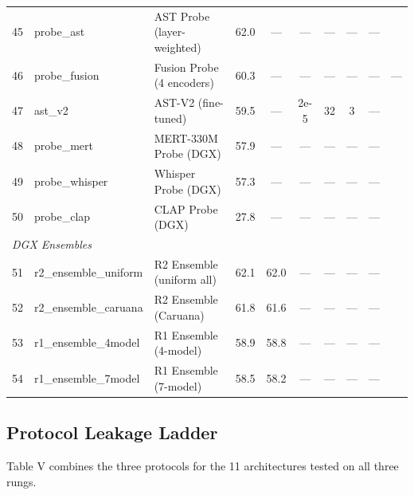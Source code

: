 \documentclass[conference]{IEEEtran}
\begin{document}
\begin{table}[t]
\begin{tabular}{rllccccccl}
\midrule
45 & probe\_ast & AST Probe (layer-weighted) & 62.0 & --- & --- & --- & --- & --- & \cite{gong2021ast} \\
46 & probe\_fusion & Fusion Probe (4 encoders) & 60.3 & --- & --- & --- & --- & --- & --- \\
47 & ast\_v2 & AST-V2 (fine-tuned) & 59.5 & --- & 2e-5 & 32 & 3 & --- & \cite{gong2021ast} \\
48 & probe\_mert & MERT-330M Probe (DGX) & 57.9 & --- & --- & --- & --- & --- & \cite{li2023mert} \\
49 & probe\_whisper & Whisper Probe (DGX) & 57.3 & --- & --- & --- & --- & --- & \cite{radford2023whisper} \\
50 & probe\_clap & CLAP Probe (DGX) & 27.8 & --- & --- & --- & --- & --- & \cite{wu2023clap} \\
\midrule
\multicolumn{10}{l}{\textit{DGX Ensembles}} \\
\midrule
51 & r2\_ensemble\_uniform & R2 Ensemble (uniform all) & 62.1 & 62.0 & --- & --- & --- & --- & \cite{kittler1998combining} \\
52 & r2\_ensemble\_caruana & R2 Ensemble (Caruana) & 61.8 & 61.6 & --- & --- & --- & --- & \cite{kittler1998combining} \\
53 & r1\_ensemble\_4model & R1 Ensemble (4-model) & 58.9 & 58.8 & --- & --- & --- & --- & \cite{kittler1998combining} \\
54 & r1\_ensemble\_7model & R1 Ensemble (7-model) & 58.5 & 58.2 & --- & --- & --- & --- & \cite{kittler1998combining} \\
\bottomrule
\end{tabular}
\end{table}

\subsection{Protocol Leakage
Ladder}\label{c.-protocol-leakage-ladder}

Table V combines the three protocols for the 11 architectures tested on
all three rungs.
\end{document}
